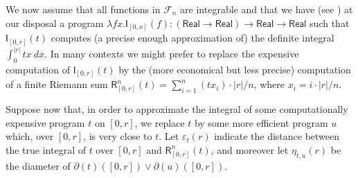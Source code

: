 \begin{example}
We now assume that all functions in $\mathcal F_{n}$ are integrable and that we have (see \cite{Edalat:2000aa}) at our disposal a program $\lambda fx.\mathsf I_{[0,x]}(f): (\mathsf{Real}\to \mathsf{Real})\to \mathsf{Real}\to \mathsf{Real}$ such that $\mathsf I_{[0,r]}(t)$ computes (a precise enough approximation of) the definite integral $\int_{0}^{|r|}tx \ dx$.
In many contexts we might prefer to replace the expensive computation of $\mathsf I_{[0,r]}(t)$ by the (more economical but less precise) computation of a finite Riemann sum $\mathsf R^{n}_{[0,r]}(t)=  \sum_{i=1}^{n}(tx_{i})\cdot |r|/n$, where 
 $x_{i}=  i\cdot |r|/n$.  


Suppose now that, in order to approximate the integral of some computationally expensive program $t$ on $[0,r]$, we replace $t$ by some more efficient program $u$ which, over $[0,r]$, is very close to $t$. Let $\varepsilon_{t}(r)$ indicate the distance between the true integral of $t$ over $[0,r]$ and $\mathsf{R}^{n}_{[0,r]}(t)$,
 and moreover let 
$\eta_{t,u}(r)$ be the diameter of $\partial(t)([0,r])\vee\partial(u)([0,r])$.


\end{example}
